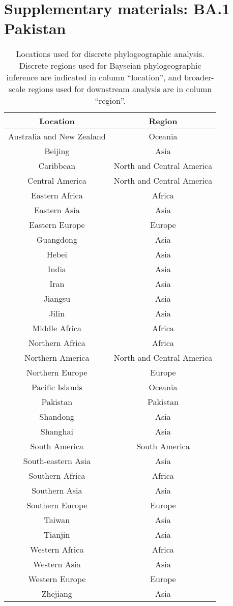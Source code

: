 \chapter{Supplementary materials: BA.1 Pakistan}
\label{appendixB}

\begin{table}[!htbp]
    \centering
    \begin{tabular}{|c|c|}
        \toprule
        Location  &  Region\\
        \midrule   
        Australia and New Zealand & Oceania\\
        Beijing & Asia\\
        Caribbean & North and Central America\\
        Central America & North and Central America\\
        Eastern Africa & Africa\\
        Eastern Asia & Asia\\
        Eastern Europe & Europe\\
        Guangdong & Asia\\
        Hebei & Asia\\
        India & Asia\\
        Iran & Asia\\
        Jiangsu & Asia\\
        Jilin & Asia\\
        Middle Africa & Africa\\
        Northern Africa & Africa\\
        Northern America & North and Central America\\
        Northern Europe & Europe\\
        Pacific Islands & Oceania\\
        Pakistan & Pakistan\\
        Shandong & Asia\\
        Shanghai & Asia\\
        South America & South America\\
        South-eastern Asia & Asia\\
        Southern Africa & Africa\\
        Southern Asia & Asia\\
        Southern Europe & Europe\\
        Taiwan & Asia\\
        Tianjin & Asia\\
        Western Africa & Africa\\
        Western Asia & Asia\\
        Western Europe & Europe\\
        Zhejiang & Asia\\
        \bottomrule
    \end{tabular}
    \caption{Locations used for discrete phylogeographic analysis. Discrete regions used for Bayseian phylogeographic inference are indicated in column ``location'', and broader-scale regions used for downstream analysis are in column ``region''.}
    \label{tab:locations}
\end{table}

